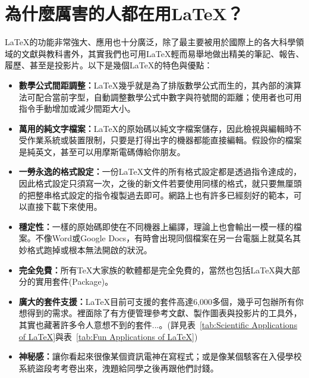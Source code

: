 \documentclass{../indiv}
\begin{document}
	\section{為什麼厲害的人都在用\LaTeX ？}
	\LaTeX 的功能非常強大、應用也十分廣泛，除了最主要被用於國際上的各大科學領域的文獻與教科書外，其實我們也可用\LaTeX 輕而易舉地做出精美的筆記、報告、履歷、甚至是投影片。以下是幾個\LaTeX 的特色與優點：
	\begin{itemize}
		\item \textbf{數學公式間距調整：}\LaTeX 幾乎就是為了排版數學公式而生的，其內部的演算法可配合當前字型，自動調整數學公式中數字與符號間的距離；使用者也可用指令手動增加或減少間距大小。
		\item \textbf{萬用的純文字檔案：}\LaTeX 的原始碼以純文字檔案儲存，因此檢視與編輯時不受作業系統或裝置限制，只要是打得出字的機器都能直接編輯。假設你的檔案是純英文，甚至可以用摩斯電碼傳給你朋友。
		\item \textbf{一勞永逸的格式設定：}一份LaTeX文件的所有格式設定都是透過指令達成的，因此格式設定只須寫一次，之後的新文件若要使用同樣的格式，就只要無厘頭的把整串格式設定的指令複製過去即可。網路上也有許多已經刻好的範本，可以直接下載下來使用。
		\item \textbf{穩定性：}一樣的原始碼即使在不同機器上編譯，理論上也會輸出一模一樣的檔案。不像Word或Google Docs，有時會出現同個檔案在另一台電腦上就莫名其妙格式跑掉或根本無法開啟的狀況。
		\item \textbf{完全免費：}所有\TeX 大家族的軟體都是完全免費的，當然也包括\LaTeX 與大部分的實用套件(Package)。
		\item \textbf{廣大的套件支援：}\LaTeX 目前可支援的套件高達6,000多個，幾乎可包辦所有你想得到的需求。裡面除了有方便管理參考文獻、製作圖表與投影片的工具外，其實也藏著許多令人意想不到的套件...。(詳見表~\ref{tab:Scientific Applications of LaTeX}與表~\ref{tab:Fun Applications of LaTeX})
		\item \textbf{神秘感：}讓你看起來很像某個資訊電神在寫程式；或是像某個駭客在入侵學校系統盜段考考卷出來，洩題給同學之後再跟他們討錢。
	\end{itemize}
	\vspace{0.1\baselineskip}
	\begin{figure}[H]
		\centering
		\hspace{1cm}
	\end{figure}
	
	\newpage
\end{document}
